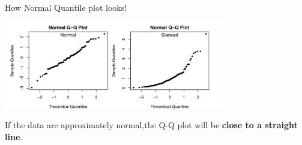 \documentclass{beamer}\usepackage[]{graphicx}\usepackage[]{color}
\begin{document}
\begin{frame}{How Normal Quantile plot looks!}

\begin{center}
\includegraphics[height=1.5in]{P13.png}
\end{center}

If the data are approximately normal,the Q-Q plot will be \textbf{close to a straight line}.
\end{frame}
\end{document}
